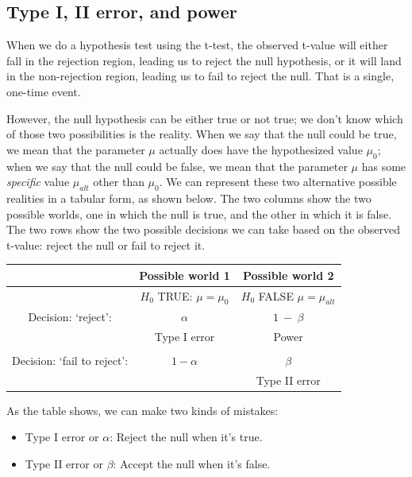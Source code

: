 \documentclass[12pt,]{krantz}
\providecommand{\tightlist}{%
  \setlength{\itemsep}{0pt}\setlength{\parskip}{0pt}}
\begin{document}
\hypertarget{type-i-ii-error-and-power}{%
\subsection{Type I, II error, and power}\label{type-i-ii-error-and-power}}

When we do a hypothesis test using the t-test, the observed t-value will either fall in the rejection region, leading us to reject the null hypothesis,
or it will land in the non-rejection region, leading us to fail to reject the null. That is a single, one-time event.

However, the null hypothesis can be either true or not true; we don't know which of those two possibilities is the reality.
When we say that the null could be true, we mean that the parameter \(\mu\) actually does have the hypothesized value \(\mu_0\); when we say that the null could be false, we mean that the parameter \(\mu\) has some \emph{specific} value \(\mu_{alt}\) other than \(\mu_0\).
We can represent these two alternative possible realities in a tabular form, as shown below. The two columns show the two possible worlds, one in which the null is true, and the other in which it is false. The two rows show the two possible decisions we can take based on the observed t-value: reject the null or fail to reject it.

\begin{tabular}{ccc}
        & \textbf{Possible world 1}      & \textbf{Possible world 2} \\  
\hline
 & $H_0$ TRUE: $\mu=\mu_0$  & $H_0$ FALSE $\mu=\mu_{alt}$ \\
\hline
Decision: `reject': & $\alpha$ & $1~-~\beta$ \\
                                     & Type I error                         & Power \\                                      
                                     & & \\
\hline
Decision: `fail to reject': & $1 - \alpha$ & $\beta$ \\                                    &                                 & Type II error\\
\hline
\end{tabular}

As the table shows, we can make two kinds of mistakes:

\begin{itemize}
\tightlist
\item
  Type I error or \(\alpha\): Reject the null when it's true.
\item
  Type II error or \(\beta\): Accept the null when it's false.
\end{itemize}
\end{document}
